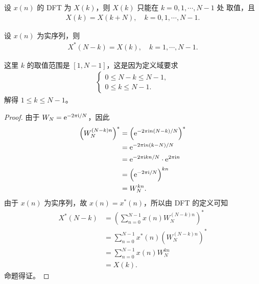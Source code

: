 \begin{property}
    设 $x(n)$ 的 DFT 为 $X(k)$，则 $X(k)$ 只能在 $k = 0, 1, \cdots, N - 1$ 处
    取值，且
    \begin{align*}
        X(k) = X(k + N), \quad k = 0, 1, \cdots, N - 1.
    \end{align*}
\end{property}

\begin{property}
    设 $x(n)$ 为实序列，则
    \begin{align*}
        X^*(N - k) = X(k), \quad k = 1, \cdots, N - 1.
    \end{align*}
\end{property}

\begin{note}
    这里 $k$ 的取值范围是 $[1, N-1]$，这是因为定义域要求
    \begin{align*}
        \begin{cases}
            0 \le N - k \le N - 1, \\
            0 \le k \le N - 1.
        \end{cases}
    \end{align*}
    解得 $1 \le k \le N - 1$。
\end{note}

\begin{proof}
    由于 $W_N = \mathrm{e}^{-2\pi\mathrm{i}/N}$，因此
    \begin{align*}
        \left(W_N^{(N - k)n}\right)^* & = \left(\mathrm{e}^{-2\pi\mathrm{i} n(N-k)/N}\right)^* \\
        & = \mathrm{e}^{-2\pi\mathrm{i} n(k-N)/N} \\
        & = \mathrm{e}^{-2\pi\mathrm{i} kn/N} \cdot \mathrm{e}^{2\pi\mathrm{i} n} \\
        & = \left(\mathrm{e}^{-2\pi\mathrm{i}/N}\right)^{kn} \\
        & = W_N^{kn}.
    \end{align*}
    由于 $x(n)$ 为实序列，故 $x(n) = x^*(n)$，所以由 DFT 的定义可知
    \begin{align*}
        X^*(N - k) & = \left(\sum_{n = 0}^{N - 1} x(n)W_N^{(N - k)n}\right)^* \\
        & = \sum_{n = 0}^{N - 1} x^*(n)\left(W_N^{(N - k)n}\right)^* \\
        & = \sum_{n = 0}^{N - 1} x(n)W_N^{kn} \\
        & = X(k).
    \end{align*}
    命题得证。
\end{proof}

